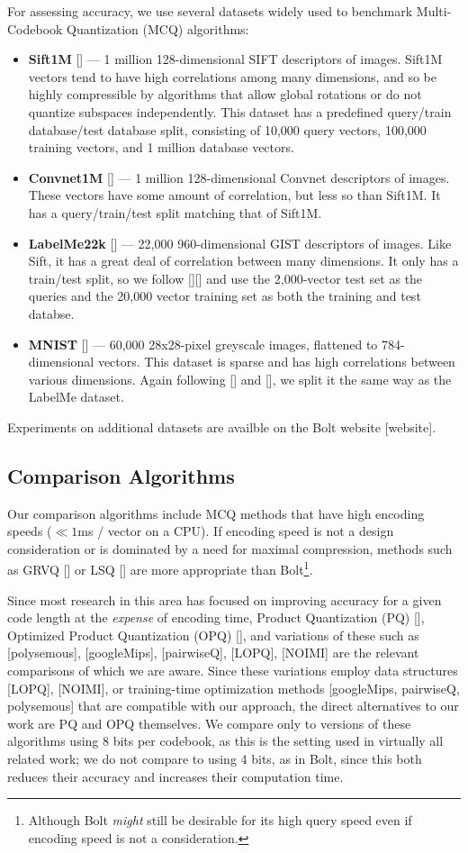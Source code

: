 For assessing accuracy, we use several datasets widely used to benchmark Multi-Codebook Quantization (MCQ) algorithms:
\begin{itemize}
\item \textbf{Sift1M} [] --- 1 million 128-dimensional SIFT descriptors of images. Sift1M vectors tend to have high correlations among many dimensions, and so be highly compressible by algorithms that allow global rotations or do not quantize subspaces independently. This dataset has a predefined query/train database/test database split, consisting of 10,000 query vectors, 100,000 training vectors, and 1 million database vectors.
\item \textbf{Convnet1M} [] --- 1 million 128-dimensional Convnet descriptors of images. These vectors have some amount of correlation, but less so than Sift1M. It has a query/train/test split matching that of Sift1M.
\item \textbf{LabelMe22k} [] --- 22,000 960-dimensional GIST descriptors of images. Like Sift, it has a great deal of correlation between many dimensions. It only has a train/test split, so we follow [][] and use the 2,000-vector test set as the queries and the 20,000 vector training set as both the training and test databse.
\item \textbf{MNIST} [] --- 60,000 28x28-pixel greyscale images, flattened to 784-dimensional vectors. This dataset is sparse and has high correlations between various dimensions. Again following [] and [], we split it the same way as the LabelMe dataset.
\end{itemize}

Experiments on additional datasets are availble on the Bolt website [website].

\subsection{Comparison Algorithms}

Our comparison algorithms include MCQ methods that have high encoding speeds ($\ll 1$ms / vector on a CPU). If encoding speed is not a design consideration or is dominated by a need for maximal compression, methods such as GRVQ [] or LSQ [] are more appropriate than Bolt\footnote{Although Bolt \textit{might} still be desirable for its high query speed even if encoding speed is not a consideration.}.

Since most research in this area has focused on improving accuracy for a given code length at the \textit{expense} of encoding time, Product Quantization (PQ) [], Optimized Product Quantization (OPQ) [], and variations of these such as [polysemous], [googleMips], [pairwiseQ], [LOPQ], [NOIMI] are the relevant comparisons of which we are aware. Since these variations employ data structures [LOPQ], [NOIMI], or training-time optimization methods [googleMips, pairwiseQ, polysemous] that are compatible with our approach, the direct alternatives to our work are PQ and OPQ themselves. We compare only to versions of these algorithms using 8 bits per codebook, as this is the setting used in virtually all related work; we do not compare to using 4 bits, as in Bolt, since this both reduces their accuracy and increases their computation time.

